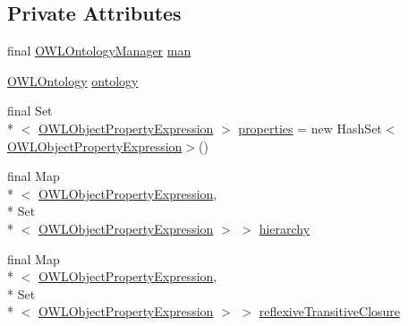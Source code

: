 \subsection*{Private Attributes}
\begin{DoxyCompactItemize}
\item 
final \hyperlink{interfaceorg_1_1semanticweb_1_1owlapi_1_1model_1_1_o_w_l_ontology_manager}{O\-W\-L\-Ontology\-Manager} \hyperlink{classorg_1_1semanticweb_1_1owlapi_1_1util_1_1_o_w_l_object_property_manager_a3b45f2770d6b5bdf01719292e5ea42c0}{man}
\item 
\hyperlink{interfaceorg_1_1semanticweb_1_1owlapi_1_1model_1_1_o_w_l_ontology}{O\-W\-L\-Ontology} \hyperlink{classorg_1_1semanticweb_1_1owlapi_1_1util_1_1_o_w_l_object_property_manager_aaa59458294336629d79a6d74df9f0be7}{ontology}
\item 
final Set\\*
$<$ \hyperlink{interfaceorg_1_1semanticweb_1_1owlapi_1_1model_1_1_o_w_l_object_property_expression}{O\-W\-L\-Object\-Property\-Expression} $>$ \hyperlink{classorg_1_1semanticweb_1_1owlapi_1_1util_1_1_o_w_l_object_property_manager_a436ae2715d67f2690c990b182e54e8a7}{properties} = new Hash\-Set$<$\hyperlink{interfaceorg_1_1semanticweb_1_1owlapi_1_1model_1_1_o_w_l_object_property_expression}{O\-W\-L\-Object\-Property\-Expression}$>$()
\item 
final Map\\*
$<$ \hyperlink{interfaceorg_1_1semanticweb_1_1owlapi_1_1model_1_1_o_w_l_object_property_expression}{O\-W\-L\-Object\-Property\-Expression}, \\*
Set\\*
$<$ \hyperlink{interfaceorg_1_1semanticweb_1_1owlapi_1_1model_1_1_o_w_l_object_property_expression}{O\-W\-L\-Object\-Property\-Expression} $>$ $>$ \hyperlink{classorg_1_1semanticweb_1_1owlapi_1_1util_1_1_o_w_l_object_property_manager_a6fb280d0a82bdd3db72ae33632b282ce}{hierarchy}
\item 
final Map\\*
$<$ \hyperlink{interfaceorg_1_1semanticweb_1_1owlapi_1_1model_1_1_o_w_l_object_property_expression}{O\-W\-L\-Object\-Property\-Expression}, \\*
Set\\*
$<$ \hyperlink{interfaceorg_1_1semanticweb_1_1owlapi_1_1model_1_1_o_w_l_object_property_expression}{O\-W\-L\-Object\-Property\-Expression} $>$ $>$ \hyperlink{classorg_1_1semanticweb_1_1owlapi_1_1util_1_1_o_w_l_object_property_manager_abef69ddaee4d8df188e02e47c21494c5}{reflexive\-Transitive\-Closure}

\end{DoxyCompactItemize}
